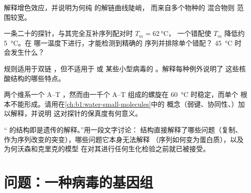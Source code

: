 \begin{exercise}[$\star\star$]\label{exo:b1:nucleic-acids:8}
解释增色效应，并说明为何纯  的解链曲线陡峭，
而来自多个物种的  混合物则
范围较宽。
\end{exercise}

\begin{exercise}[$\star\star$]\label{exo:b1:nucleic-acids:9}
一条二十的探针，与其完全互补序列配对时 $T_m = \qty{62}{\celsius}$，
一个错配使 $T_m$ 降低约 \qty{5}{\celsius}。在
哪一温度下进行，才能检测到精确的
序列并排除单个错配？
\qty{45}{\celsius} 时会发生什么？
\end{exercise}

\begin{exercise}[$\star\star\star$]\label{exo:b1:nucleic-acids:10}
规则适用于双链 ，但不适用于  或
某些小型病毒的 。解释每种例外说明了
这些核酸结构的哪些特点。
\end{exercise}

\begin{exercise}[$\star\star\star$]\label{exo:b1:nucleic-acids:11}
两个维系一个 A--T ，然而由一千个 A--T
组成的螺旋在 \qty{60}{\celsius} 时稳定，而单个
根本不能形成。请用在\cref{ch:b1:water-small-molecules}中的
概念（弱键、协同性、）加以解释，并说明
这对探针的保真度有何意义。
\end{exercise}

\begin{exercise}[$\star\star\star$]\label{exo:b1:nucleic-acids:12}
“ 的结构即是遗传的解释。”用一段文字讨论：
结构直接解释了哪些问题（复制、
作为序列改变的突变），哪些问题它本身无法解释
（序列如何变为蛋白质），以及为何沃森和克里克的模型
在对其进行任何生化检验之前就已被接受。
\end{exercise}

\section{问题：一种病毒的基因组}


